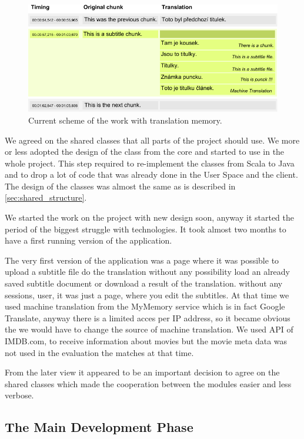 \begin{figure}
\begin{center}
\includegraphics{./figures/current_strucutre.pdf}
\end{center}
\caption{Current scheme of the work with translation memory.}\label{fig:new_scheme}
\end{figure}

We agreed on the shared classes that all parts of the project should use.  We more or less adopted the design of the class from the core and started to use in the whole project. This step required to re-implement the classes from Scala to Java and to drop a lot of code that was already done in the User Space and the client. The design of the classes was almost the same as is described in \ref{sec:shared_structure}.

We started the work on the project with new design soon, anyway it started the period of the biggest struggle with technologies. It took almost two months to have a first running version of the application.

The very first version of the application was a page where it was possible to upload a subtitle file do the translation without any possibility load an already saved subtitle document or download a result of the translation. without any sessions, user, it was just a page, where you edit the subtitles. At that time we used machine translation from the MyMemory service which is in fact Google Translate, anyway there is a limited acces per IP address, so it became obvious the we would have to change the source of machine translation. We used API of IMDB.com, to receive information about movies but the movie meta data was not used in the evaluation the matches at that time.

From the later view it appeared to be an important decision to agree on the shared classes which made the cooperation between the modules easier and less verbose. 

\subsection{The Main Development Phase}

